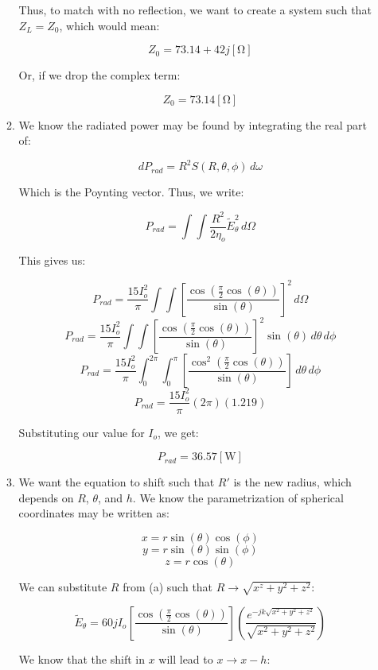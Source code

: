\begin{enumerate}
\begin{enumerate}
        Thus, to match with no reflection, we want to create a system such that $Z_L=Z_0$, which would mean:

        $$\boxed{Z_0=73.14+42j[\si{\ohm}]}$$

        Or, if we drop the complex term:

        $$\boxed{Z_0=73.14[\si{\ohm}]}$$


      \item 

        We know the radiated power may be found by integrating the real part of:

        $$dP_{rad}=R^2S(R,\theta,\phi)\,d\omega$$

        Which is the Poynting vector. Thus, we write:

        $$P_{rad}=\int\int \frac{R^2}{2\eta_o}\tilde{E}_\theta^2\,d\Omega$$

        This gives us:

        $$P_{rad}=\frac{15I_o^2}{\pi}\int\int\left[ \frac{\cos\left( \frac{\pi}{2}\cos(\theta) \right)}{\sin(\theta)} \right]^2\,d\Omega$$
        $$P_{rad}=\frac{15I_o^2}{\pi}\int\int\left[ \frac{\cos\left( \frac{\pi}{2}\cos(\theta) \right)}{\sin(\theta)} \right]^2\sin(\theta)\,d\theta\,d\phi$$
        $$P_{rad}=\frac{15I_o^2}{\pi}\int_0^{2\pi}\int_0^\pi\left[ \frac{\cos^2\left( \frac{\pi}{2}\cos(\theta) \right)}{\sin(\theta)} \right]\,d\theta\,d\phi$$
        $$P_{rad}=\frac{15I_o^2}{\pi}\left(2\pi  \right)\left( 1.219 \right)$$

        Substituting our value for $I_o$, we get:

        $$\boxed{P_{rad}=36.57[\si{\watt}]}$$

      \item 

        We want the equation to shift such that $R\prime$ is the new radius, which depends on $R$, $\theta$, and $h$. We know the parametrization of spherical coordinates may be written as:

        $$x=r\sin(\theta)\cos(\phi)$$
        $$y=r\sin(\theta)\sin(\phi)$$
        $$z=r\cos(\theta)$$

        We can substitute $R$ from (a) such that $R\to\sqrt{x^z+y^2+z^2}$:

        $$\tilde{E}_\theta=60jI_o\left[ \frac{\cos\left( \frac{\pi}{2}\cos(\theta) \right)}{\sin(\theta)} \right]\left( \frac{e^{-jk\sqrt{x^2+y^2+z^2}}}{\sqrt{x^2+y^2+z^2}} \right)$$

        We know that the shift in $x$ will lead to $x\to x-h$:


\end{enumerate}
\end{enumerate}
